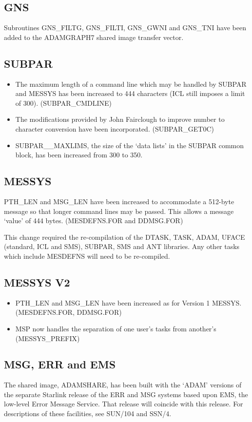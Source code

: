 \subsection{GNS}
Subroutines GNS\_FILTG, GNS\_FILTI, GNS\_GWNI and GNS\_TNI have been added to
the ADAMGRAPH7 shared image transfer vector.

\subsection{SUBPAR}
\begin{itemize}
\item The maximum length of a command line which may be handled by SUBPAR
and MESSYS has been increased to 444 characters (ICL still imposes a limit
of 300).
(SUBPAR\_CMDLINE)
\item The modifications provided by John Fairclough to improve number to
character conversion have been incorporated.
(SUBPAR\_GET0C)
\item SUBPAR\_\_MAXLIMS, the size of the `data lists' in the SUBPAR common
block, has been increased from 300 to 350.
\end{itemize}

\subsection{MESSYS}
PTH\_LEN and MSG\_LEN have been increased to  accommodate a 512-byte message
so that longer command lines may be passed. This allows a message `value'
of 444 bytes.
(MES\-DEFNS\-.FOR and DDMSG\-.FOR)

This change required the re-compilation of the DTASK, TASK, ADAM,
UFACE (standard, ICL and SMS), SUBPAR, SMS and ANT libraries.
Any other tasks which include MESDEFNS will need to be re-compiled.

\subsection{MESSYS V2}
\begin{itemize}
\item PTH\_LEN and MSG\_LEN have been increased as for Version 1 MESSYS.
(MESDEFNS.FOR, DDMSG.FOR)
\item MSP now handles the separation of one user's tasks from another's
(MESSYS\_PREFIX)
\end{itemize}

\subsection{MSG, ERR and EMS}
The shared image, ADAMSHARE, has been built with the `ADAM' versions of the
separate Starlink release of the ERR and MSG systems based upon EMS, the
low-level Error Message Service. That release will coincide with this release.
For descriptions of these facilities, see SUN/104 and SSN/4.

